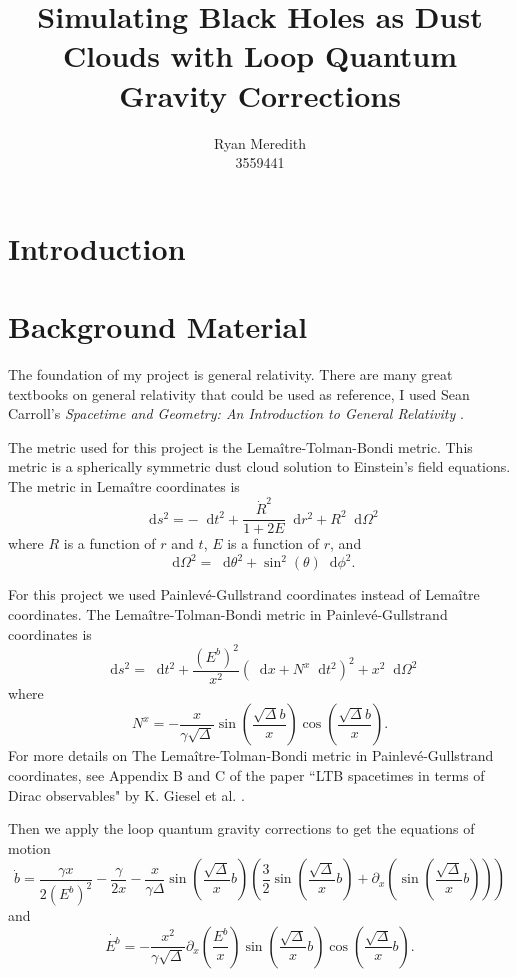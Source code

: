 \documentclass[12pt]{article}
\title{Simulating Black Holes as Dust Clouds with Loop Quantum Gravity Corrections}
\author{Ryan Meredith\\3559441}
\newcommand{\dd}{\mathop{}\!\mathrm{d}}
\begin{document}
\maketitle

\tableofcontents

\section{Introduction}

\section{Background Material}

The foundation of my project is general relativity. There are many great textbooks on
general relativity that could be used as reference, I used Sean Carroll's
\textit{Spacetime and Geometry: An Introduction to General Relativity} \cite{gr}.

The metric used for this project is the Lema\^{i}tre-Tolman-Bondi metric. This metric is a
spherically symmetric dust cloud solution to Einstein's field equations. The metric in
Lema\^{i}tre coordinates is
\[ \dd s^2 = -\dd t^2 + \frac{\dot{R}^2}{1 + 2E} \dd r^2 + R^2\dd \Omega^2 \]
where $R$ is a function of $r$ and $t$, $E$ is a function of $r$, and
\[ \dd \Omega^2 = \dd \theta^2 + \sin^2(\theta)\dd \phi^2. \]

For this project we used Painlev\'{e}-Gullstrand coordinates instead of Lema\^{i}tre
coordinates. The Lema\^{i}tre-Tolman-Bondi metric in Painlev\'{e}-Gullstrand coordinates
is
\[ \dd s^2 = \dd t^2 + \frac{(E^b)^2}{x^2} (\dd x + N^x\dd t^2)^2 + x^2 \dd \Omega^2 \]
where
\[ N^x = -\frac{x}{\gamma\sqrt{\Delta}} \sin\left(\frac{\sqrt{\Delta}b}{x}\right)
\cos\left(\frac{\sqrt{\Delta}b}{x}\right). \]
For more details on The Lema\^{i}tre-Tolman-Bondi metric in Painlev\'{e}-Gullstrand
coordinates, see Appendix B and C of the paper ``LTB spacetimes in terms of Dirac
observables" by K. Giesel et al. \cite{metric}.

Then we apply the loop quantum gravity corrections to get the equations of motion
\[ \dot{b} = \frac{\gamma x}{2(E^b)^2} - \frac{\gamma}{2x} - \frac{x}{\gamma\Delta}
\sin\left( \frac{\sqrt{\Delta}}{x}b \right) \left( \frac{3}{2}\sin\left(
\frac{\sqrt{\Delta}}{x}b \right) + \partial_x \left(
\sin\left(\frac{\sqrt{\Delta}}{x}b\right) \right) \right) \]
and
\[ \dot{E^b} = -\frac{x^2}{\gamma\sqrt{\Delta}} \partial_x \left( \frac{E^b}{x} \right)
\sin \left( \frac{\sqrt{\Delta}}{x}b \right) \cos \left( \frac{\sqrt{\Delta}}{x}b
\right). \]
\end{document}
